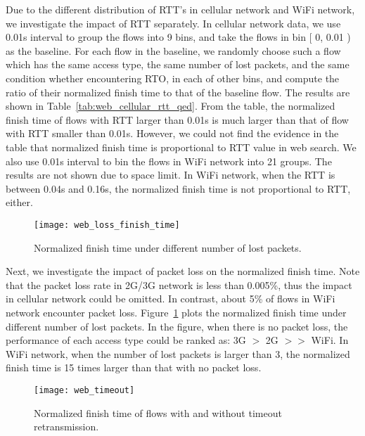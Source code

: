 Due to the different distribution of RTT's in cellular network and WiFi network, we investigate the impact of RTT separately. In cellular network data, we use 0.01s interval to group the flows into 9 bins, and take the flows in bin $[$ 0, 0.01 ) as the baseline. For each flow in the baseline, we randomly choose such a flow which has the same access type, the same number of lost packets, and the same condition whether encountering RTO, in each of other bins, and compute the ratio of their normalized finish time to that of the baseline flow. The results are shown in Table~\ref{tab:web_cellular_rtt_qed}. From the table, the normalized finish time of flows with RTT larger than 0.01s is much larger than that of flow with RTT smaller than 0.01s. However, we could not find the evidence in the table that normalized finish time is proportional to RTT value in web search. We also use 0.01s interval to bin the flows in WiFi network into 21 groups. The results are not shown due to space limit. In WiFi network, when the RTT is between 0.04s and 0.16s, the normalized finish time is not proportional to RTT, either. 

\begin{figure}[th]
\centering
\texttt{[image: web\_loss\_finish\_time]}
\caption{Normalized finish time under different number of lost packets.}
\label{fig:web_loss_finish_time}
\end{figure}

Next, we investigate the impact of packet loss on the normalized finish time. Note that the packet loss rate in 2G/3G network is less than 0.005\%, thus the impact in cellular network could be omitted. In contrast, about 5\% of flows in WiFi network encounter packet loss. Figure~\ref{fig:web_loss_finish_time} plots the normalized finish time under different number of lost packets. In the figure, when there is no packet loss, the performance of each access type could be ranked as: 3G $>$ 2G $>>$ WiFi. In WiFi network, when the number of lost packets is larger than 3, the normalized finish time is 15 times larger than that with no packet loss.

\begin{figure}[th]
\centering
\texttt{[image: web\_timeout]}
\caption{Normalized finish time of flows with and without timeout retransmission.}
\label{fig:web_timeout}
\end{figure}

